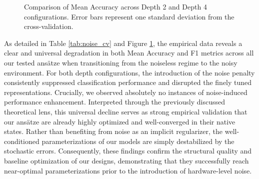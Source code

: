 \documentclass[11pt]{article}
\begin{document}
\begin{figure}[htbp]
    \centering
    \caption{Comparison of Mean Accuracy across Depth 2 and Depth 4 configurations. Error bars represent one standard deviation from the cross-validation.}
    \label{fig:noise_cv_chart}
\end{figure}

As detailed in Table \ref{tab:noise_cv} and Figure \ref{fig:noise_cv_chart}, the empirical data reveals a clear and universal degradation in both Mean Accuracy and F1 metrics across all our tested ans\"atze when transitioning from the noiseless regime to the noisy environment. For both depth configurations, the introduction of the noise penalty consistently suppressed classification performance and disrupted the finely tuned representations. Crucially, we observed absolutely no instances of noise-induced performance enhancement. Interpreted through the previously discussed theoretical lens, this universal decline serves as strong empirical validation that our ans\"atze are already highly optimized and well-converged in their native states. Rather than benefiting from noise as an implicit regularizer, the well-conditioned parameterizations of our models are simply destabilized by the stochastic errors. Consequently, these findings confirm the structural quality and baseline optimization of our designs, demonstrating that they successfully reach near-optimal parameterizations prior to the introduction of hardware-level noise.
\end{document}
